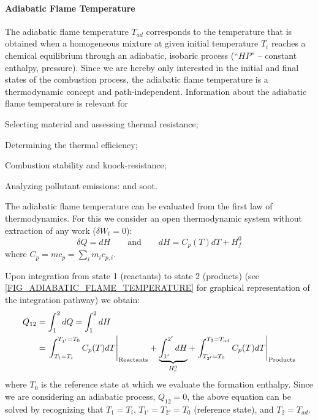 \paragraph{\label{SUBSEC_ADIABATIC_FLAME_TEMP}Adiabatic Flame Temperature}
The adiabatic flame temperature $T_{ad}$ corresponds to the temperature that is obtained when a homogeneous mixture at given initial temperature $T_i$ reaches a chemical equilibrium through an adiabatic, isobaric process (``$HP$'' -- constant enthalpy, pressure). Since we are hereby only interested in the initial and final states of the combustion process,  the adiabatic flame temperature is a thermodynamic concept and path-independent. Information about the adiabatic flame temperature is relevant for
\begin{itemizePacked}
  \item Selecting material and assessing thermal resistance;
  \item Determining the thermal efficiency;
  \item Combustion stability and knock-resistance; 
  \item Analyzing pollutant emissions:  and soot.
\end{itemizePacked}
The adiabatic flame temperature can be evaluated from the first law of thermodynamics. For this we consider an open thermodynamic system without extraction of any work ($\delta W_t=0$):
\begin{equation}
  \delta Q=d H\qquad \text{and}\qquad dH = C_p(T)d T + H^0_f
\end{equation}
where $C_p = m c_p = \sum_i m_i c_{p,i}$.

Upon integration from state 1 (reactants) to state 2 (products) (see \cref{FIG_ADIABATIC_FLAME_TEMPERATURE} for graphical representation of the integration pathway) we obtain:
\begin{equation}
  \begin{split}
  Q_{12} &= \int^2_1 d Q = \int^2_1 d H\\
              &= \left.\int^{T_{1'}=T_0}_{T_1=T_i} C_p(T) d T\right|_{\rm{Reactants}} + 
        \underbrace{\int^{2'}_{1'} d H}_{H^0_r} + \left.\int^{T_2=T_{ad}}_{T_{2'}=T_0} C_p(T) d T\right|_{\rm{Products}}
  \end{split}
\end{equation}
where $T_0$ is the reference state at which we evaluate the formation enthalpy. Since we are considering an adiabatic process, $Q_{12}=0$, the above equation can be solved by recognizing that $T_1=T_i$, $T_{1'}=T_{2'}=T_0$ (reference state), and  $T_2=T_{ad}$.

